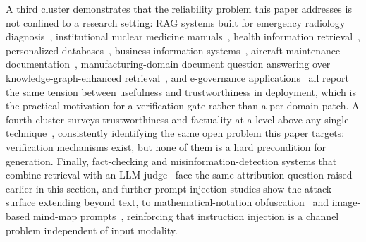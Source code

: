 \documentclass[conference]{IEEEtran}
\begin{document}
A third cluster demonstrates that the reliability problem this paper
addresses is not confined to a research setting: RAG systems built for
emergency radiology diagnosis~\cite{fink2025radiology}, institutional
nuclear medicine manuals~\cite{fukui2025nuclearmedicine}, health
information retrieval~\cite{upadhyay2025health}, personalized
databases~\cite{byun2024interactive}, business information
systems~\cite{klesel2025rag}, aircraft maintenance
documentation~\cite{signe2025substring}, manufacturing-domain document
question answering over knowledge-graph-enhanced
retrieval~\cite{knollmeyer2025documentgraphrag}, and e-governance
applications~\cite{papageorgiou2025agentic} all report the same tension
between usefulness and trustworthiness in deployment, which is the
practical motivation for a verification gate rather than a per-domain
patch. A fourth cluster surveys trustworthiness and factuality at a level
above any single technique~\cite{wang2025factuality, lin2024trustworthy,
dong2025safeguarding, huang2024safetyvv, brown2025systematic,
rahman2026hallucination, abdullahi2025hallucinationreview}, consistently
identifying the same open problem this paper targets: verification
mechanisms exist, but none of them is a hard precondition for generation.
Finally, fact-checking and misinformation-detection systems that combine
retrieval with an LLM judge~\cite{cheung2023factllama,
pendyala2024misinformation} face the same attribution question raised
earlier in this section, and further prompt-injection studies show the
attack surface extending beyond text, to mathematical-notation
obfuscation~\cite{kwon2024mathinjection} and image-based mind-map
prompts~\cite{lee2025mindmapping}, reinforcing that instruction injection is
a channel problem independent of input modality.
\end{document}
